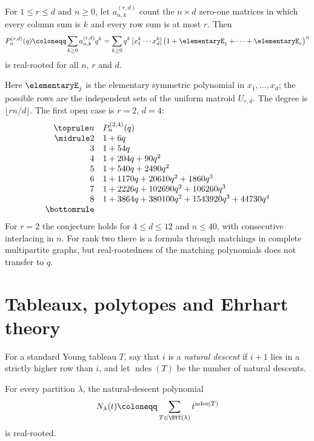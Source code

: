 \begin{conjecture}
\label{conjBalancedArrays}
For $1\leq r\leq d$ and $n\geq0$, let $a^{(r,d)}_{n,k}$ count the
$n\times d$ zero-one matrices in which every column sum is $k$ and every row
sum is at most $r$.  Then
\[
  P^{(r,d)}_n(q)\coloneqq\sum_{k\geq0}a^{(r,d)}_{n,k}q^k
  =\sum_{k\geq0}q^k\,[x_1^k\dotsm x_d^k]\,
  \bigl(1+\elementaryE_1+\dotsb+\elementaryE_r\bigr)^n
\]
is real-rooted for all $n$, $r$ and $d$.
\end{conjecture}

Here $\elementaryE_j$ is the elementary symmetric polynomial in
$x_1,\dotsc,x_d$; the possible rows are the independent sets of the uniform
matroid $U_{r,d}$.  The degree is $\lfloor rn/d\rfloor$.  The first open
case is $r=2$, $d=4$:
\[
\begin{array}{rl}
\toprule
n & P^{(2,4)}_n(q) \\
\midrule
2 & 1+6q \\
3 & 1+54q \\
4 & 1+204q+90q^2 \\
5 & 1+540q+2490q^2 \\
6 & 1+1170q+20610q^2+1860q^3 \\
7 & 1+2226q+102690q^2+106260q^3 \\
8 & 1+3864q+380100q^2+1543920q^3+44730q^4 \\
\bottomrule
\end{array}
\]
For $r=2$ the conjecture holds for $4\leq d\leq12$ and $n\leq40$, with
consecutive interlacing in $n$.  For rank two there is a formula through matchings in complete
multipartite graphs, but real-rootedness of the matching polynomials does
not transfer to $q$.


\section[openProblemsPolytopes]{Tableaux, polytopes and Ehrhart theory}

For a standard Young tableau $T$, say that $i$ is a \emph{natural descent}
if $i+1$ lies in a strictly higher row than $i$, and let $\operatorname{ndes}(T)$
be the number of natural descents.

\begin{conjecture}[Alexandersson, 2026]
\label{conjSYTNaturalDescents}
For every partition $\lambda$, the natural-descent polynomial
\[
  N_\lambda(t)\coloneqq\sum_{T\in\SYT(\lambda)}t^{\operatorname{ndes}(T)}
\]
is real-rooted.
\end{conjecture}

